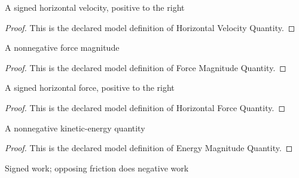 \begin{definition}
  \label{def:physics:phyx-mini-0798:phyxminiproblems-problemphyxmini0798-horizontalvelocityquantity}
  A signed horizontal velocity, positive to the right
\end{definition}
\begin{proof}
  This is the declared model definition of Horizontal Velocity Quantity.
\end{proof}
\begin{definition}
  \label{def:physics:phyx-mini-0798:phyxminiproblems-problemphyxmini0798-forcemagnitudequantity}
  A nonnegative force magnitude
\end{definition}
\begin{proof}
  This is the declared model definition of Force Magnitude Quantity.
\end{proof}
\begin{definition}
  \label{def:physics:phyx-mini-0798:phyxminiproblems-problemphyxmini0798-horizontalforcequantity}
  A signed horizontal force, positive to the right
\end{definition}
\begin{proof}
  This is the declared model definition of Horizontal Force Quantity.
\end{proof}
\begin{definition}
  \label{def:physics:phyx-mini-0798:phyxminiproblems-problemphyxmini0798-energymagnitudequantity}
  A nonnegative kinetic-energy quantity
\end{definition}
\begin{proof}
  This is the declared model definition of Energy Magnitude Quantity.
\end{proof}
\begin{definition}
  \label{def:physics:phyx-mini-0798:phyxminiproblems-problemphyxmini0798-signedworkquantity}
  Signed work; opposing friction does negative work
\end{definition}
